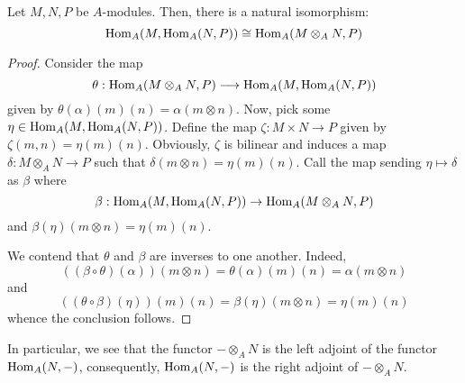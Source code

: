 \begin{proposition}
    Let $M,N,P$ be $A$-modules. Then, there is a natural isomorphism:
    \begin{equation*}
        \operatorname{Hom}_A(M,\operatorname{Hom}_A(N, P))\cong\operatorname{Hom}_A(M\otimes_A N, P)
    \end{equation*}
\end{proposition}
\begin{proof}
    Consider the map 
    \begin{equation*}
        \theta: \operatorname{Hom}_A(M\otimes_A N, P)\longrightarrow\operatorname{Hom}_A(M,\operatorname{Hom}_A(N, P))
    \end{equation*}
    given by $\theta(\alpha)(m)(n) = \alpha(m\otimes n)$. Now, pick some $\eta\in\operatorname{Hom}_A(M,\operatorname{Hom}_A(N,P))$. Define the map $\zeta: M\times N\to P$ given by $\zeta(m, n) = \eta(m)(n)$. Obviously, $\zeta$ is bilinear and induces a map $\delta: M\otimes_A N\to P$ such that $\delta(m\otimes n) = \eta(m)(n)$. Call the map sending $\eta\mapsto\delta$ as $\beta$ where 
    \begin{equation*}
        \beta: \operatorname{Hom}_A(M,\operatorname{Hom}_A(N, P))\to\operatorname{Hom}_A(M\otimes_A N, P)
    \end{equation*}
    and $\beta(\eta)(m\otimes n) = \eta(m)(n)$.

    We contend that $\theta$ and $\beta$ are inverses to one another. Indeed, 
    \begin{equation*}
        ((\beta\circ\theta)(\alpha))(m\otimes n) = \theta(\alpha)(m)(n) = \alpha(m\otimes n)
    \end{equation*}
    and 
    \begin{equation*}
        ((\theta\circ\beta)(\eta))(m)(n) = \beta(\eta)(m\otimes n) = \eta(m)(n)
    \end{equation*}
    whence the conclusion follows.
\end{proof}

In particular, we see that the functor $-\otimes_A N$ is the left adjoint of the functor $\operatorname{Hom}_A(N,-)$, consequently, $\operatorname{Hom}_A(N,-)$ is the right adjoint of $-\otimes_A N$.

